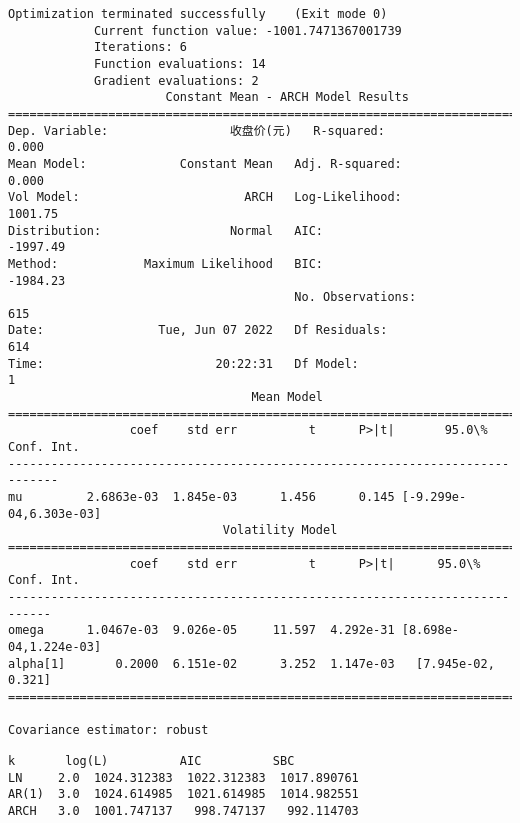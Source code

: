 \documentclass[11pt]{article}
\makeatletter
\newcommand{\boxspacing}{\kern\kvtcb@left@rule\kern\kvtcb@boxsep}
\newcommand{\prompt}[4]{
        {\ttfamily\llap{{\color{#2}[#3]:\hspace{3pt}#4}}\vspace{-\baselineskip}}
    }
\makeatother
\begin{document}
    \begin{Verbatim}[commandchars=\\\{\}]
Optimization terminated successfully    (Exit mode 0)
            Current function value: -1001.7471367001739
            Iterations: 6
            Function evaluations: 14
            Gradient evaluations: 2
                      Constant Mean - ARCH Model Results
==============================================================================
Dep. Variable:                 收盘价(元)   R-squared:                       0.000
Mean Model:             Constant Mean   Adj. R-squared:                  0.000
Vol Model:                       ARCH   Log-Likelihood:                1001.75
Distribution:                  Normal   AIC:                          -1997.49
Method:            Maximum Likelihood   BIC:                          -1984.23
                                        No. Observations:                  615
Date:                Tue, Jun 07 2022   Df Residuals:                      614
Time:                        20:22:31   Df Model:                            1
                                  Mean Model
=============================================================================
                 coef    std err          t      P>|t|       95.0\% Conf. Int.
-----------------------------------------------------------------------------
mu         2.6863e-03  1.845e-03      1.456      0.145 [-9.299e-04,6.303e-03]
                              Volatility Model
============================================================================
                 coef    std err          t      P>|t|      95.0\% Conf. Int.
----------------------------------------------------------------------------
omega      1.0467e-03  9.026e-05     11.597  4.292e-31 [8.698e-04,1.224e-03]
alpha[1]       0.2000  6.151e-02      3.252  1.147e-03   [7.945e-02,  0.321]
============================================================================

Covariance estimator: robust
    \end{Verbatim}

            \begin{tcolorbox}[breakable, size=fbox, boxrule=.5pt, pad at break*=1mm, opacityfill=0]
\prompt{Out}{outcolor}{16}{\boxspacing}
\begin{Verbatim}[commandchars=\\\{\}]
         k       log(L)          AIC          SBC
LN     2.0  1024.312383  1022.312383  1017.890761
AR(1)  3.0  1024.614985  1021.614985  1014.982551
ARCH   3.0  1001.747137   998.747137   992.114703
\end{Verbatim}
\end{tcolorbox}
        
\end{document}
